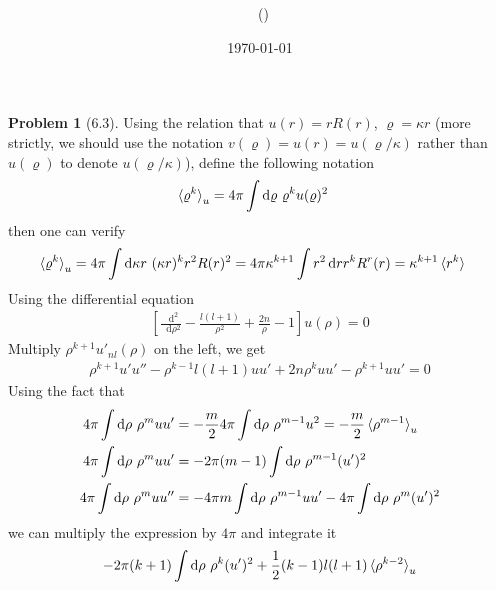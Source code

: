 \documentclass[twoside,11pt]{article}
\title{{\lms \Code \ \Ass}}
\author{\lms \name \ (\href{mailto:\mail}{\mail})}
\date{\sffamily \today}
\makeatletter
\renewcommand*\d{\mathop{}\!\mathrm{d}}
\theoremstyle{definition}
\newtheorem{problem}{Problem}
\theoremstyle{remark}
\newtheorem*{remark}{Remark}
\renewcommand{\maketitle}{\bgroup\setlength{\parindent}{0pt}
\begin{flushleft}
  \textbf{\Large\@title}

  \@author
\end{flushleft}\egroup
}
\makeatother
\begin{document}
\maketitle
\thispagestyle{title}


\begin{problem}[6.3]
Using the relation that $u(r) = rR(r)$, $\varrho=\kappa r$
(more strictly, we should use the notation $v(\varrho)=u(r)=u(\varrho/\kappa)$ rather than $u(\varrho)$
to denote $u(\varrho/\kappa)$),
define the following notation
\begin{align*}
    \braket{\varrho^k}_u &= 4\pi\int\d \varrho\ \varrho^k u(\varrho)^2
\end{align*}
then one can verify
\begin{align*}
    \braket{\varrho^k}_u &= 4\pi\int\d \kappa r\ (\kappa r)^k r^2 R(r)^2
    =4\pi\kappa^{k+1} \int r^2\d r r^kR^r(r) = \kappa^{k+1}\braket{r^k}
\end{align*}
Using the differential equation
\begin{align}
    \left[
        \frac{\d^2}{\d\rho^2} - \frac{l(l+1)}{\rho^2} + \frac{2n}{\rho} - 1
    \right]u(\rho) = 0
\end{align}
Multiply $\rho^{k+1}u'_{nl}(\rho)$ on the left, we get
\begin{align*}
    \rho^{k+1}u'u'' - \rho^{k-1}l(l+1)uu' + 2n\rho^k uu' - \rho^{k+1}uu' = 0
\end{align*}
Using the fact that
\begin{align*}
    4\pi\int\d\rho\ \rho^m uu' &= -\frac{m}{2}4\pi\int\d\rho\ \rho^{m-1}u^2
    = -\frac{m}{2}\braket{\rho^{m-1}}_u\\
    4\pi\int\d\rho\ \rho^m uu' &= -2\pi(m-1)\int\d\rho\ \rho^{m-1} (u')^2\\
    4\pi\int\d\rho\ \rho^m uu'' &= -4\pi m\int\d\rho\ \rho^{m-1}uu' -4\pi\int\d\rho\
    \rho^m (u')^2
\end{align*}
we can multiply the expression by $4\pi$ and integrate it
\begin{align}
    -2\pi (k+1)\int\d\rho\ \rho^k (u')^2 + \frac{1}{2}(k-1)l(l+1)\braket{\rho^{k-2}}_u

\end{align}
\end{problem}
\end{document}
